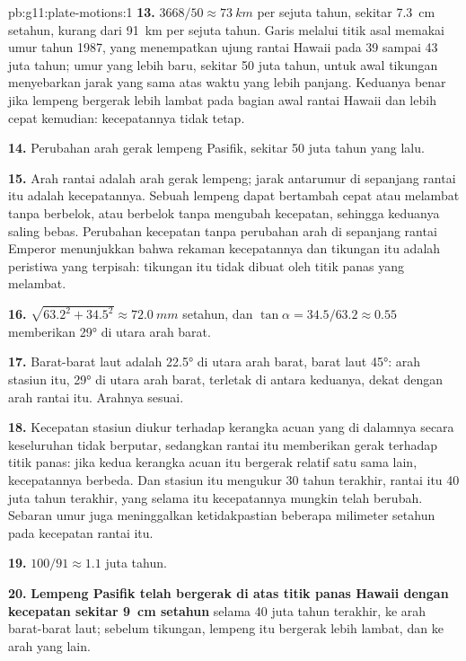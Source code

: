 \begin{solution}{pb:g11:plate-motions:1}
\textbf{13.} $3668/50 \approx \qty{73}{km}$ per sejuta tahun, sekitar
\qty{7.3}{cm} setahun, kurang dari \qty{91}{km} per sejuta tahun. Garis melalui
titik asal memakai umur tahun 1987, yang menempatkan ujung rantai Hawaii pada 39
sampai 43 juta tahun; umur yang lebih baru, sekitar 50 juta tahun, untuk awal
tikungan menyebarkan jarak yang sama atas waktu yang lebih panjang. Keduanya
benar jika lempeng bergerak lebih lambat pada bagian awal rantai Hawaii dan lebih
cepat kemudian: kecepatannya tidak tetap.

\textbf{14.} Perubahan arah gerak lempeng Pasifik, sekitar 50 juta tahun yang
lalu.

\textbf{15.} Arah rantai adalah arah gerak lempeng; jarak antarumur di
sepanjang rantai itu adalah kecepatannya. Sebuah lempeng dapat bertambah cepat
atau melambat tanpa berbelok, atau berbelok tanpa mengubah kecepatan, sehingga
keduanya saling bebas. Perubahan kecepatan tanpa perubahan arah di sepanjang
rantai Emperor menunjukkan bahwa rekaman kecepatannya dan tikungan itu adalah
peristiwa yang terpisah: tikungan itu tidak dibuat oleh titik panas yang
melambat.

\textbf{16.} $\sqrt{63.2^2 + 34.5^2} \approx \qty{72.0}{mm}$ setahun, dan
$\tan\alpha = 34.5/63.2 \approx 0.55$ memberikan \ang{29} di utara arah barat.

\textbf{17.} Barat-barat laut adalah \ang{22.5} di utara arah barat, barat laut
\ang{45}: arah stasiun itu, \ang{29} di utara arah barat, terletak di antara
keduanya, dekat dengan arah rantai itu. Arahnya sesuai.

\textbf{18.} Kecepatan stasiun diukur terhadap kerangka acuan yang di dalamnya
 secara keseluruhan tidak berputar, sedangkan rantai itu memberikan gerak
terhadap titik panas: jika kedua kerangka acuan itu bergerak relatif satu sama
lain, kecepatannya berbeda. Dan stasiun itu mengukur 30 tahun terakhir, rantai
itu 40 juta tahun terakhir, yang selama itu kecepatannya mungkin telah berubah.
Sebaran umur juga meninggalkan ketidakpastian beberapa milimeter setahun pada
kecepatan rantai itu.

\textbf{19.} $100/91 \approx 1.1$ juta tahun.

\textbf{20.} \textbf{Lempeng Pasifik telah bergerak di atas titik panas Hawaii
dengan kecepatan sekitar \qty{9}{cm} setahun} selama 40 juta tahun terakhir, ke
arah barat-barat laut; sebelum tikungan, lempeng itu bergerak lebih lambat, dan
ke arah yang lain.
\end{solution}
